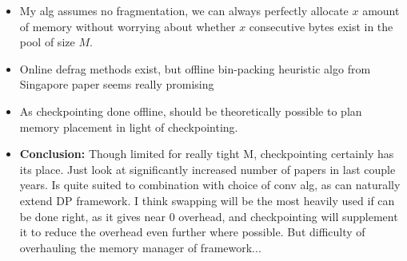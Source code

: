 \begin{itemize}[topsep=0.2em]
    \item My alg assumes no fragmentation, we can always perfectly allocate \(x\) amount of memory without worrying about whether \(x\) consecutive bytes exist in the pool of size \(M\).
    \item Online defrag methods exist, but offline bin-packing heuristic algo from Singapore paper seems really promising
    \item As checkpointing done offline, should be theoretically possible to plan memory placement in light of checkpointing.
    \item \textbf{Conclusion:} Though limited for really tight M, checkpointing certainly has its place. Just look at significantly increased number of papers in last couple years. Is quite suited to combination with choice of conv alg, as can naturally extend DP framework. I think swapping will be the most heavily used if can be done right, as it gives near 0 overhead, and checkpointing will supplement it to reduce the overhead even further where possible. But difficulty of overhauling the memory manager of framework...
\end{itemize}